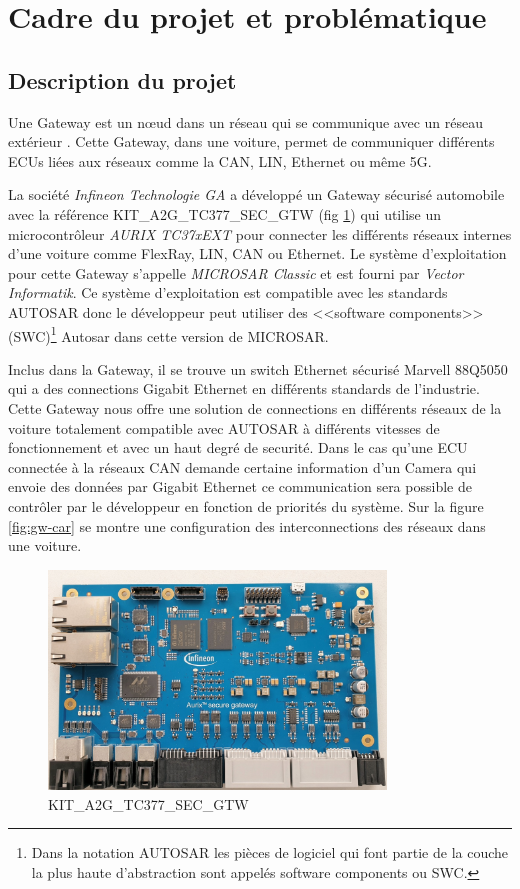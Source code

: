 \section{Cadre du projet et probl\'ematique}

\subsection{Description du projet}

Une Gateway est un nœud dans un réseau qui se communique avec un réseau extérieur \cite{gateway-definition}. Cette Gateway, dans une voiture, permet de communiquer différents ECUs li\'ees aux réseaux comme la CAN, LIN, Ethernet ou même 5G. 

La société \textit{Infineon Technologie GA} a développé un Gateway sécurisé automobile avec la référence KIT\_A2G\_TC377\_SEC\_GTW \cite{gateway} (fig \ref{fig:gw-photo}) qui utilise un microcontrôleur \textit{AURIX TC37xEXT} pour connecter les différents réseaux internes d'une voiture comme FlexRay, LIN, CAN ou Ethernet. Le système d'exploitation pour cette Gateway s'appelle \textit{MICROSAR Classic} \cite{vector.microsar} et est fourni par \textit{Vector Informatik}. Ce système d'exploitation est compatible avec les standards AUTOSAR\cite{autosar-intro} donc le développeur peut utiliser des <<software components>> (SWC)\footnote{Dans la notation AUTOSAR les pièces de logiciel qui font partie de la couche la plus haute d'abstraction sont appel\'es software components ou SWC\cite{swc_man}.} Autosar dans cette version de MICROSAR. 

Inclus dans la Gateway, il se trouve un switch Ethernet sécurisé Marvell 88Q5050\cite{sw88Q5050} qui a des connections Gigabit Ethernet en différents standards de l'industrie. Cette Gateway nous offre une solution de connections en différents réseaux de la voiture totalement compatible avec AUTOSAR \`a différents vitesses de fonctionnement et avec un haut degré de securit\'e. Dans le cas qu'une ECU connect\'ee à la réseaux CAN demande certaine information d'un Camera qui envoie des données par Gigabit Ethernet ce communication sera possible de contrôler par le développeur en fonction de priorités du système. Sur la figure \ref{fig:gw-car} se montre une configuration des interconnections des réseaux dans une voiture. 

\begin{figure}[!htb]
 \centering
 \includegraphics[width=0.8\textwidth]{img/secure-gateway.jpg}
 \caption{KIT\_A2G\_TC377\_SEC\_GTW}
 \label{fig:gw-photo}
\end{figure}

